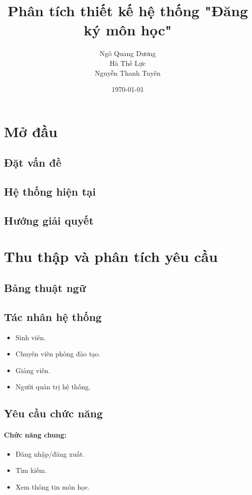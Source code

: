 \documentclass{article}
\title{\textbf{Phân tích thiết kế hệ thống "Đăng ký môn học"}}
\author{
  Ngô Quang Dương\\
  Hà Thế Lực\\
  Nguyễn Thanh Tuyên
}
\date{\today}
\begin{document}
\maketitle

\begin{abstract}
\end{abstract}

\section{Mở đầu}

  \subsection{Đặt vấn đề}

  \subsection{Hệ thống hiện tại}

  \subsection{Hướng giải quyết}

\section{Thu thập và phân tích yêu cầu}
  
  \subsection{Bảng thuật ngữ}
  
  \subsection{Tác nhân hệ thống}
    \begin{itemize}
      \item Sinh viên.
      \item Chuyên viên phòng đào tạo.
      \item Giảng viên.
      \item Người quản trị hệ thống.
    \end{itemize}
  
  \subsection{Yêu cầu chức năng}
    \paragraph{
      \textnormal{
        Chức năng chung:
      }
    }
    \begin{itemize}
      \item Đăng nhập/đăng xuất.
      \item Tìm kiếm.
      \item Xem thông tin môn học.
    \end{itemize}
\end{document}
